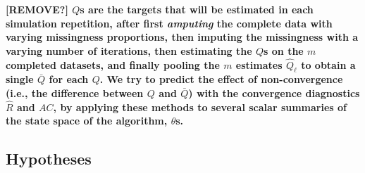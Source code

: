 \documentclass[Royal,times,sageh]{sagej}
\begin{document}
\textbf{{[}REMOVE?{]} \(Q\)s are the targets that will be estimated in each simulation repetition, after first \emph{amputing} the complete data with varying missingness proportions, then imputing the missingness with a varying number of iterations, then estimating the \(Q\)s on the \(m\) completed datasets, and finally pooling the \(m\) estimates \(\hat{Q}_\ell\) to obtain a single \(\bar{Q}\) for each \(Q\). We try to predict the effect of non-convergence (i.e., the difference between \(Q\) and \(\bar{Q}\)) with the convergence diagnostics \(\widehat{R}\) and \(AC\), by applying these methods to several scalar summaries of the state space of the algorithm, \(\theta\)s.}

\hypertarget{hypotheses}{%
\subsection{Hypotheses}\label{hypotheses}}
\end{document}
